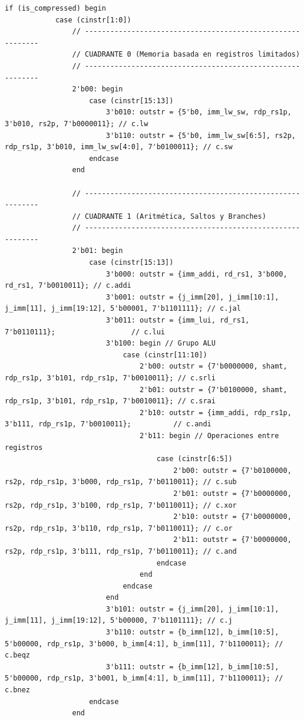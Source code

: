 \documentclass[12pt, a4paper]{article}
\begin{document}
\begin{lstlisting}[style=verilogstyle, caption={Código Verilog del módulo descompresor RVC}]
        if (is_compressed) begin
            case (cinstr[1:0])
                // -----------------------------------------------------------
                // CUADRANTE 0 (Memoria basada en registros limitados)
                // -----------------------------------------------------------
                2'b00: begin 
                    case (cinstr[15:13])
                        3'b010: outstr = {5'b0, imm_lw_sw, rdp_rs1p, 3'b010, rs2p, 7'b0000011}; // c.lw
                        3'b110: outstr = {5'b0, imm_lw_sw[6:5], rs2p, rdp_rs1p, 3'b010, imm_lw_sw[4:0], 7'b0100011}; // c.sw
                    endcase
                end

                // -----------------------------------------------------------
                // CUADRANTE 1 (Aritmética, Saltos y Branches)
                // -----------------------------------------------------------
                2'b01: begin 
                    case (cinstr[15:13])
                        3'b000: outstr = {imm_addi, rd_rs1, 3'b000, rd_rs1, 7'b0010011}; // c.addi
                        3'b001: outstr = {j_imm[20], j_imm[10:1], j_imm[11], j_imm[19:12], 5'b00001, 7'b1101111}; // c.jal
                        3'b011: outstr = {imm_lui, rd_rs1, 7'b0110111};                  // c.lui
                        3'b100: begin // Grupo ALU
                            case (cinstr[11:10])
                                2'b00: outstr = {7'b0000000, shamt, rdp_rs1p, 3'b101, rdp_rs1p, 7'b0010011}; // c.srli
                                2'b01: outstr = {7'b0100000, shamt, rdp_rs1p, 3'b101, rdp_rs1p, 7'b0010011}; // c.srai
                                2'b10: outstr = {imm_addi, rdp_rs1p, 3'b111, rdp_rs1p, 7'b0010011};          // c.andi
                                2'b11: begin // Operaciones entre registros
                                    case (cinstr[6:5])
                                        2'b00: outstr = {7'b0100000, rs2p, rdp_rs1p, 3'b000, rdp_rs1p, 7'b0110011}; // c.sub
                                        2'b01: outstr = {7'b0000000, rs2p, rdp_rs1p, 3'b100, rdp_rs1p, 7'b0110011}; // c.xor
                                        2'b10: outstr = {7'b0000000, rs2p, rdp_rs1p, 3'b110, rdp_rs1p, 7'b0110011}; // c.or
                                        2'b11: outstr = {7'b0000000, rs2p, rdp_rs1p, 3'b111, rdp_rs1p, 7'b0110011}; // c.and
                                    endcase
                                end
                            endcase
                        end
                        3'b101: outstr = {j_imm[20], j_imm[10:1], j_imm[11], j_imm[19:12], 5'b00000, 7'b1101111}; // c.j
                        3'b110: outstr = {b_imm[12], b_imm[10:5], 5'b00000, rdp_rs1p, 3'b000, b_imm[4:1], b_imm[11], 7'b1100011}; // c.beqz
                        3'b111: outstr = {b_imm[12], b_imm[10:5], 5'b00000, rdp_rs1p, 3'b001, b_imm[4:1], b_imm[11], 7'b1100011}; // c.bnez
                    endcase
                end


\end{lstlisting}
\end{document}
